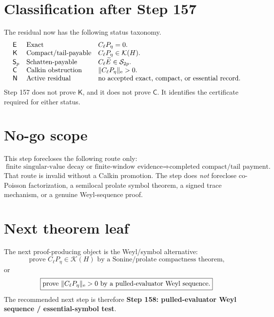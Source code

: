 \documentclass[11pt]{article}
\begin{document}
\section*{Classification after Step 157}
The residual now has the following status taxonomy.
\[
\begin{array}{lll}
\mathsf E & \text{Exact} & C_\ell P_\eta=0.\\
\mathsf K & \text{Compact/tail-payable} & C_\ell P_\eta\in\mathcal K(H).\\
\mathsf S_p & \text{Schatten-payable} & C_\ell\widetilde E\in\mathcal S_{2p}.\\
\mathsf C & \text{Calkin obstruction} & \|C_\ell P_\eta\|_{\rm e}>0.\\
\mathsf N & \text{Active residual} & \text{no accepted exact, compact, or essential record.}
\end{array}
\]
Step 157 does not prove \(\mathsf K\), and it does not prove \(\mathsf C\).  It identifies the certificate required for either status.

\section*{No-go scope}
This step forecloses the following route only:
\[
  \text{finite singular-value decay or finite-window evidence}
  \Rightarrow
  \text{completed compact/tail payment.}
\]
That route is invalid without a Calkin promotion.  The step does \emph{not} foreclose co-Poisson factorization, a semilocal prolate symbol theorem, a signed trace mechanism, or a genuine Weyl-sequence proof.

\section*{Next theorem leaf}
The next proof-producing object is the Weyl/symbol alternative:
\[
  \boxed{\text{prove }C_\ell P_\eta\in\mathcal K(H)\text{ by a Sonine/prolate compactness theorem,}}
\]
or
\[
  \boxed{\text{prove }\|C_\ell P_\eta\|_{\rm e}>0\text{ by a pulled-evaluator Weyl sequence.}}
\]
The recommended next step is therefore \textbf{Step 158: pulled-evaluator Weyl sequence / essential-symbol test}.
\end{document}
